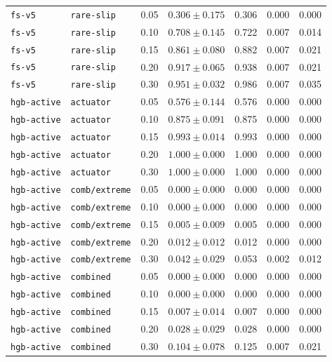 \documentclass{article}
\begin{document}
\begin{center}
\begin{tabular}{lllcccc}
\texttt{fs-v5} & \texttt{rare-slip} & 0.05 & $0.306 \pm 0.175$ & 0.306 & 0.000 & 0.000 \\
\texttt{fs-v5} & \texttt{rare-slip} & 0.10 & $0.708 \pm 0.145$ & 0.722 & 0.007 & 0.014 \\
\texttt{fs-v5} & \texttt{rare-slip} & 0.15 & $0.861 \pm 0.080$ & 0.882 & 0.007 & 0.021 \\
\texttt{fs-v5} & \texttt{rare-slip} & 0.20 & $0.917 \pm 0.065$ & 0.938 & 0.007 & 0.021 \\
\texttt{fs-v5} & \texttt{rare-slip} & 0.30 & $0.951 \pm 0.032$ & 0.986 & 0.007 & 0.035 \\
\texttt{hgb-active} & \texttt{actuator} & 0.05 & $0.576 \pm 0.144$ & 0.576 & 0.000 & 0.000 \\
\texttt{hgb-active} & \texttt{actuator} & 0.10 & $0.875 \pm 0.091$ & 0.875 & 0.000 & 0.000 \\
\texttt{hgb-active} & \texttt{actuator} & 0.15 & $0.993 \pm 0.014$ & 0.993 & 0.000 & 0.000 \\
\texttt{hgb-active} & \texttt{actuator} & 0.20 & $1.000 \pm 0.000$ & 1.000 & 0.000 & 0.000 \\
\texttt{hgb-active} & \texttt{actuator} & 0.30 & $1.000 \pm 0.000$ & 1.000 & 0.000 & 0.000 \\
\texttt{hgb-active} & \texttt{comb/extreme} & 0.05 & $0.000 \pm 0.000$ & 0.000 & 0.000 & 0.000 \\
\texttt{hgb-active} & \texttt{comb/extreme} & 0.10 & $0.000 \pm 0.000$ & 0.000 & 0.000 & 0.000 \\
\texttt{hgb-active} & \texttt{comb/extreme} & 0.15 & $0.005 \pm 0.009$ & 0.005 & 0.000 & 0.000 \\
\texttt{hgb-active} & \texttt{comb/extreme} & 0.20 & $0.012 \pm 0.012$ & 0.012 & 0.000 & 0.000 \\
\texttt{hgb-active} & \texttt{comb/extreme} & 0.30 & $0.042 \pm 0.029$ & 0.053 & 0.002 & 0.012 \\
\texttt{hgb-active} & \texttt{combined} & 0.05 & $0.000 \pm 0.000$ & 0.000 & 0.000 & 0.000 \\
\texttt{hgb-active} & \texttt{combined} & 0.10 & $0.000 \pm 0.000$ & 0.000 & 0.000 & 0.000 \\
\texttt{hgb-active} & \texttt{combined} & 0.15 & $0.007 \pm 0.014$ & 0.007 & 0.000 & 0.000 \\
\texttt{hgb-active} & \texttt{combined} & 0.20 & $0.028 \pm 0.029$ & 0.028 & 0.000 & 0.000 \\
\texttt{hgb-active} & \texttt{combined} & 0.30 & $0.104 \pm 0.078$ & 0.125 & 0.007 & 0.021 \\

\end{tabular}
\end{center}
\end{document}
